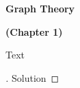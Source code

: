 \documentclass[12pt,oneside]{article}
\begin{document}
\begin{center}
    {\bf Graph Theory}

    {\bf  (Chapter 1)}
\end{center}

\begin{problem}[1]
Text
\end{problem}
\begin{proof}[]
    Solution
\end{proof}
\end{document}
